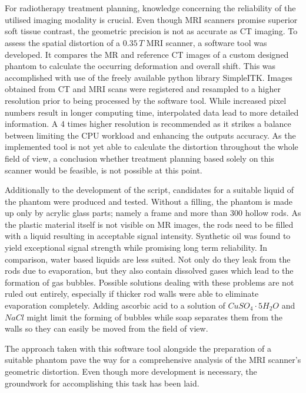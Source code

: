 \let\oldcleardoublepage\cleardoublepage
\renewcommand\cleardoublepage{}

\chapter*{\abstractname}
For radiotherapy treatment planning, knowledge concerning the reliability of the utilised imaging modality is crucial.
Even though MRI scanners promise superior soft tissue contrast, the geometric precision is not as accurate as CT imaging.
To assess the spatial distortion of a $0.35\, T$ MRI scanner, a software tool was developed.
It compares the MR and reference CT images of a custom designed phantom to calculate the occurring deformation and overall shift.
This was accomplished with use of the freely available python library SimpleITK.
Images obtained from CT and MRI scans were registered and resampled to a higher resolution prior to being processed by the software tool.
While increased pixel numbers result in longer computing time, interpolated data lead to more detailed information.
A 4 times higher resolution is recommended as it strikes a balance between limiting the CPU workload and enhancing the outputs accuracy.
As the implemented tool is not yet able to calculate the distortion throughout the whole field of view, a conclusion whether treatment planning based solely on this scanner would be feasible, is not possible at this point.

Additionally to the development of the script, candidates for a suitable liquid of the phantom were produced and tested.
Without a filling, the phantom is made up only by acrylic glass parts; namely a frame and more than 300 hollow rods.
As the plastic material itself is not visible on MR images, the rods need to be filled with a liquid resulting in acceptable signal intensity.
Synthetic oil was found to yield exceptional signal strength while promising long term reliability.
In comparison, water based liquids are less suited.
Not only do they leak from the rods due to evaporation, but they also contain dissolved gases which lead to the formation of gas bubbles.
Possible solutions dealing with these problems are not ruled out entirely, especially if thicker rod walls were able to eliminate evaporation completely.
Adding ascorbic acid to a solution of $CuSO_4\cdot5H_2O$ and $NaCl$ might limit the forming of bubbles while soap separates them from the walls so they can easily be moved from the field of view.

The approach taken with this software tool alongside the preparation of a suitable phantom pave the way for a comprehensive analysis of the MRI scanner's geometric distortion.
Even though more development is necessary, the groundwork for accomplishing this task has been laid.


\let\cleardoublepage\oldcleardoublepage
\newpage
